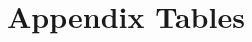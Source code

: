 \documentclass[11pt]{article}
\begin{document}




\setcounter{table}{0}
\renewcommand{\thetable}{A\arabic{table}}
\setcounter{figure}{0}
\renewcommand{\thefigure}{A\arabic{figure}}
    
\section{Appendix Tables}   
\label{app:Tables}
\begin{spacing}{1.3}    



\end{spacing}


\clearpage
\end{document}
